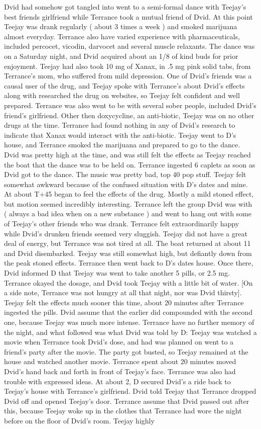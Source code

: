 \documentclass[12pt]{book}
\begin{document}
Dvid had somehow got tangled into went to a semi-formal dance with Teejay's best friends girlfriend while Terrance took a mutual friend of Dvid. At this point Teejay was drank regularly ( about 3 times a week ) and smoked marijuana almost everyday. Terrance also have varied experience with pharmaceuticals, included percocet, vicodin, darvocet and several muscle relaxants. The dance was on a Saturday night, and Dvid acquired about an 1/8 of kind buds for prior enjoyment. Teejay had also took 10 mg of Xanax, in .5 mg pink solid tabs, from Terrance's mom, who suffered from mild depression. One of Dvid's friends was a causal user of the drug, and Teejay spoke with Terrance's about Dvid's effects along with researched the drug on websites, so Teejay felt confident and well prepared. Terrance was also went to be with several sober people, included Dvid's friend's girlfriend. Other then doxycycline, an anti-biotic, Teejay was on no other drugs at the time. Terrance had found nothing in any of Dvid's research to indicate that Xanax would interact with the anti-biotic. Teejay went to D's house, and Terrance smoked the marijuana and prepared to go to the dance. Dvid was pretty high at the time, and was still felt the effects as Teejay reached the boat that the dance was to be held on. Terrance ingested 6 caplets as soon as Dvid got to the dance. The music was pretty bad, top 40 pop stuff. Teejay felt somewhat awkward because of the confused situation with D's dates and mine. At about T+45 began to feel the effects of the drug. Mostly a mild stoned effect, but motion seemed incredibly interesting. Terrance left the group Dvid was with ( always a bad idea when on a new substance ) and went to hang out with some of Teejay's other friends who was drank. Terrance felt extraordinarily happy while Dvid's drunken friends seemed very sluggish. Teejay did not have a great deal of energy, but Terrance was not tired at all. The boat returned at about 11 and Dvid disembarked. Teejay was still somewhat high, but defiantly down from the peak stoned effects. Terrance then went back to D's dates house. Once there, Dvid informed D that Teejay was went to take another 5 pills, or 2.5 mg. Terrance okayed the dosage, and Dvid took Teejay with a little bit of water. [On a side note, Terrance was not hungry at all that night, nor was Dvid thirsty]. Teejay felt the effects much sooner this time, about 20 minutes after Terrance ingested the pills. Dvid assume that the earlier did compounded with the second one, because Teejay was much more intense. Terrance have no further memory of the night, and what followed was what Dvid was told by D: Teejay was watched a movie when Terrance took Dvid's dose, and had was planned on went to a friend's party after the movie. The party got busted, so Teejay remained at the house and watched another movie. Terrance spent about 20 minutes moved Dvid's hand back and forth in front of Teejay's face. Terrance was also had trouble with expressed ideas. At about 2, D secured Dvid's a ride back to Teejay's house with Terrance's girlfriend. Dvid told Teejay that Terrance dropped Dvid off and opened Teejay's door. Terrance assume that Dvid passed out after this, because Teejay woke up in the clothes that Terrance had wore the night before on the floor of Dvid's room. Teejay highly 
\end{document}
